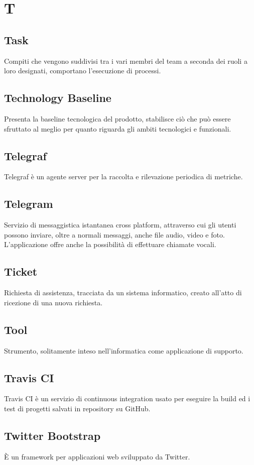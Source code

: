 \section*{T}

\subsection{Task}
Compiti che vengono suddivisi tra i vari membri del team a seconda dei ruoli a loro designati, comportano l'esecuzione di processi.

\subsection{Technology Baseline}
Presenta la baseline tecnologica del prodotto, stabilisce ciò che può essere sfruttato al meglio per quanto riguarda gli ambiti tecnologici  e funzionali.

\subsection{Telegraf}
Telegraf è un agente server per la raccolta e rilevazione periodica di metriche.

\subsection{Telegram}
Servizio di messaggistica istantanea cross platform, attraverso cui gli utenti possono inviare, oltre a normali messaggi, anche file audio, video e foto. L'applicazione offre anche la possibilità di effettuare chiamate vocali.

\subsection{Ticket}
Richiesta di assistenza, tracciata da un sistema informatico, creato all'atto di ricezione di una nuova richiesta.

\subsection{Tool}
Strumento, solitamente inteso nell'informatica come applicazione di supporto.

\subsection{Travis CI}
Travis CI è un servizio di continuous integration usato per eseguire la build ed i test di progetti salvati in repository su GitHub.\\

\subsection{Twitter Bootstrap}
È un framework per applicazioni web sviluppato da Twitter.


